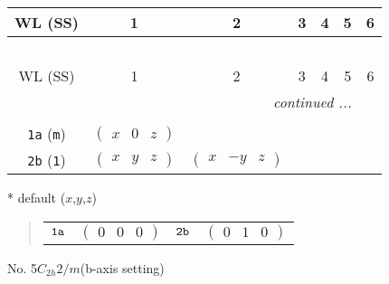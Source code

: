\documentclass[fleqn,9pt,landscape]{jsarticle}
\begin{document}
\begin{center}
\renewcommand{\arraystretch}{1.2}
\begin{longtable}{ccccccc}
 \hline \hline
WL (SS) & 1 & 2 & 3 & 4 & 5 & 6 \\ \hline \endfirsthead

\multicolumn{6}{l}{\tablename\ \thetable{}} \\
 \hline \hline
WL (SS) & 1 & 2 & 3 & 4 & 5 & 6 \\ \hline \endhead

 \hline \hline
\multicolumn{6}{r}{\footnotesize\it continued ...} \\ \endfoot

 \hline \hline
\multicolumn{6}{r}{} \\ \endlastfoot

{\tt 1a} ({\tt m}) & $ \begin{pmatrix} x & 0 & z \end{pmatrix} $ & $  $ \\ \hline
{\tt 2b} ({\tt 1}) & $ \begin{pmatrix} x & y & z \end{pmatrix} $ & $ \begin{pmatrix} x & - y & z \end{pmatrix} $ \\
\end{longtable}
\end{center}
* default ($x$,$y$,$z$)
\begin{quote}
\begin{tabular}{cccc}
$ {\tt 1a} $ & $ \begin{pmatrix} 0 & 0 & 0 \end{pmatrix} $ & $ {\tt 2b} $ & $ \begin{pmatrix} 0 & 1 & 0 \end{pmatrix} $
\end{tabular}
\end{quote}
\newpage
No. 5\quad$C_{2h}$\quad$2/m$\quad(b-axis setting)\quad[ monoclinic ]
\end{document}
